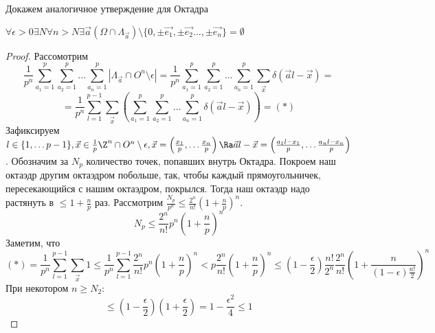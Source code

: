 Докажем аналогичное утверждение для Октадра
\begin{theorem}
    \(\forall \epsilon > 0 \exists N \forall n > N \exists \vec{a} (\Omega \cap \Lambda_{\vec{a}}) \setminus \{0, \pm \vec{e_1}, \pm \vec{e_2} \dots , \pm \vec{e_n}\} = \emptyset\)
\end{theorem}
\begin{proof}
    Рассомотрим 
    \[\frac{1}{p^n}\sum_{a_1 = 1}^p\sum_{a_2 = 1}^p\dots \sum_{a_n = 1}^p |\Lambda_{\vec{a}} \cap O^n \setminus \epsilon| = \frac{1}{p^n}\sum_{a_1 = 1}^p\sum_{a_2 = 1}^p\dots \sum_{a_n = 1}^p\sum_{\vec{x}} \delta(\vec{a}l - \vec{x}) = \]
    \[ = \frac{1}{p^n}\sum_{l = 1}^{p - 1}\sum_{\vec{x}}\left(\sum_{a_1 = 1}^p\sum_{a_2 = 1}^p\dots \sum_{a_n = 1}^p \delta(\vec{a}l - \vec{x})\right) = (*)\]
    Зафиксируем \(l \in \{1, \dots p - 1\}, \vec{x} \in \frac{1}{p}\Z^n \cap O^n \setminus \epsilon, \vec{x} = \left(\frac{x_1}{p}, \dots \frac{x_n}{p}\right) \Ra \vec{a}l - \vec{x} = \left(\frac{a_1l - x_1}{p}, \dots \frac{a_nl - x_n}{p}\right)\). Обозначим за \(N_p\) количество точек, попавших внутрь Октадра. 
    Покроем наш октаэдр другим октаэдром побольше, так, чтобы каждый прямоугольничек, пересекающийся с нашим октаэдром, покрылся. Тогда наш октаэдр надо растянуть в \(\le 1 + \frac{n}{p}\) раз. Рассмотрим \(\frac{N_p}{p^n} \le \frac{2^n}{n!} \left(1 + \frac{n}{p}\right)^n\). 
    \[N_p \le \frac{2^n}{n!}p^n\left(1 + \frac{n}{p}\right)^n\]
    Заметим, что
    \[(*) = \frac{1}{p^n}\sum_{l = 1}^{p - 1}\sum_{\vec{x}}1 \le \frac{1}{p^n}\sum_{l = 1}^{p - 1}\frac{2^n}{n!}p^n\left(1 + \frac{n}{p}\right)^n < p \frac{2^n}{n!} \left(1 + \frac{n}{p}\right)^n \le \left(1 - \frac{\epsilon}{2}\right)\frac{n!}{2^n} \frac{2^n}{n!}\left(1 + \frac{n}{\left(1 - \epsilon\right)\frac{n!}{2}}\right)^n\]
    При некотором \(n \ge N_2\):
    \[\le \left(1 - \frac{\epsilon}{2}\right)\left(1 + \frac{\epsilon}{2}\right) = 1 - \frac{\epsilon^2}{4} \le 1\]
\end{proof}